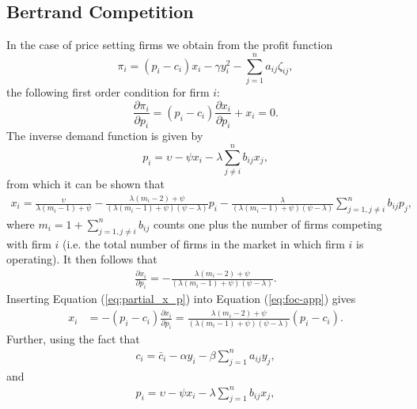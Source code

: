 \subsection{Bertrand Competition}
\label{sec:bertrand}
In the case of price setting firms we obtain from the profit function%
\begin{equation}
\pi_i = (p_i - c_i)x_i - \gamma y_i^2 - \sum_{j=1}^n a_{ij} \zeta_{ij},
\label{eq:profit-app}
\end{equation}
the following first order condition for firm $i$:
\begin{equation}
\frac{\partial \pi _{i}}{\partial p_{i}} = (p_i-c_i) \dfrac{\partial x_i}{\partial p_i} + x_i = 0.
\label{eq:foc-app}
\end{equation}
The inverse demand function is given by %
\begin{equation*}
p_i = \upsilon - \psi x_i - \lambda \sum_{j \ne i}^n b_{ij} x_j,
\end{equation*}
from which it can be shown that
\begin{align*}
x_i = \frac{\upsilon}{\lambda (m_i-1)+\psi} 
- 
 \frac{\lambda (m_i-2)+\psi}{(\lambda (m_i-1)+\psi)(\psi-\lambda)} 
p_i
-
 \frac{\lambda}{(\lambda (m_i-1)+\psi)(\psi-\lambda)} 
\sum_{j=1, j \neq i}^n b_{ij} p_j,
\end{align*}
where $m_i = 1+\sum_{j=1, j \neq i}^n b_{ij}$ counts one plus the number of firms competing with firm $i$ (i.e. the total number of firms in the market in which firm $i$ is operating). It then follows that
\begin{align}
\frac{\partial x_i}{\partial p_i} =
- 
 \frac{\lambda (m_i-2)+\psi}{(\lambda (m_i-1)+\psi)(\psi-\lambda)}.
\label{eq:partial_x_p}
\end{align}
Inserting Equation (\ref{eq:partial_x_p}) into Equation (\ref{eq:foc-app}) gives
\begin{align}
x_i & = -(p_i-c_i) \frac{\partial x_i}{\partial p_i}
= 
\frac{\lambda (m_i-2)+\psi}{(\lambda (m_i-1)+\psi)(\psi-\lambda)} 
(p_i-c_i).
\label{eq:x_i_app}
\end{align}
Further, using the fact that
\begin{align*}
c_i = \bar{c}_i - \alpha y_i - \beta \sum_{j=1}^n a_{ij} y_j,
\end{align*}
and
\begin{align*}
p_i = \upsilon - \psi x_i - \lambda \sum_{j=1}^n b_{ij} x_j,
\end{align*}
